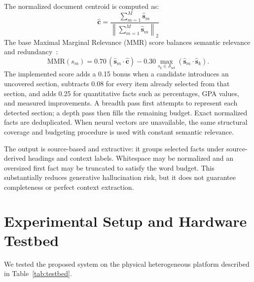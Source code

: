 \documentclass[conference]{IEEEtran}
\begin{document}
The normalized document centroid is computed as:
\begin{equation}
  \hat{\mathbf{c}} = \frac{\sum_{m=1}^M \hat{\mathbf{s}}_m}{\left\|\sum_{m=1}^M \hat{\mathbf{s}}_m\right\|_2}
\end{equation}
The base Maximal Marginal Relevance (MMR) score balances semantic relevance and redundancy~\cite{mmr1998}:
\begin{equation}
  \text{MMR}(s_m) = 0.70\,(\hat{\mathbf{s}}_m \cdot \hat{\mathbf{c}}) - 0.30 \max_{s_k \in \mathcal{S}_{\text{sel}}} (\hat{\mathbf{s}}_m \cdot \hat{\mathbf{s}}_k).
\end{equation}
The implemented score adds a 0.15 bonus when a candidate introduces an uncovered section, subtracts 0.08 for every item already selected from that section, and adds 0.25 for quantitative facts such as percentages, GPA values, and measured improvements. A breadth pass first attempts to represent each detected section; a depth pass then fills the remaining budget. Exact normalized facts are deduplicated. When neural vectors are unavailable, the same structural coverage and budgeting procedure is used with constant semantic relevance.

The output is source-based and extractive: it groups selected facts under source-derived headings and context labels. Whitespace may be normalized and an oversized first fact may be truncated to satisfy the word budget. This substantially reduces generative hallucination risk, but it does not guarantee completeness or perfect context extraction.
\section{Experimental Setup and Hardware Testbed}

We tested the proposed system on the physical heterogeneous platform described in Table~\ref{tab:testbed}.

\begin{table}[t]
\caption{Physical Testbed Node Specifications}
\label{tab:testbed}
\centering
{}
\end{table}
\end{document}
